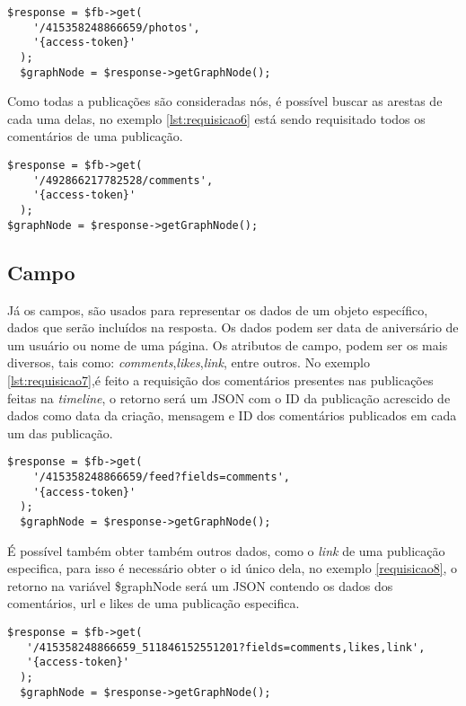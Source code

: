 \begin{lstlisting}[caption={Requisitando todas álbuns de uma página},label={lst:requisicao5}]
  $response = $fb->get( 
    '/415358248866659/photos', 
    '{access-token}'
  );
  $graphNode = $response->getGraphNode();
\end{lstlisting}

Como todas a publicações são consideradas nós, é possível buscar as arestas de cada uma delas, no exemplo \ref{lst:requisicao6} está sendo requisitado todos os comentários de uma publicação.

\begin{lstlisting}[caption={Requisitando todos os comentários de uma publicação},label={lst:requisicao6}]
  $response = $fb->get(
    '/492866217782528/comments',
    '{access-token}'
  );
$graphNode = $response->getGraphNode();
\end{lstlisting}

\subsection{Campo}
Já os campos, são usados para representar os dados de um objeto específico, dados que serão incluídos na resposta. Os dados podem ser data de aniversário de um usuário ou nome de uma página. Os atributos de campo, podem ser os mais diversos, tais como: \textit{comments},\textit{likes},\textit{link}, entre outros. No exemplo \ref{lst:requisicao7},é feito a requisição dos comentários presentes nas publicações feitas na \textit{timeline}, o retorno será um JSON com o ID da publicação acrescido de dados como data da criação, mensagem e ID dos comentários publicados em cada um das publicação.

\begin{lstlisting}[caption={Requisitar os comentários de todas as publicações da página},label={lst:requisicao7}]
  $response = $fb->get(
    '/415358248866659/feed?fields=comments',
    '{access-token}' 
  );
  $graphNode = $response->getGraphNode(); 
\end{lstlisting}

É possível também obter também outros dados, como o \textit{link} de uma publicação especifica, para isso é necessário obter o id único dela, no exemplo \ref{requisicao8}, o retorno na variável \$graphNode será um JSON contendo os dados dos comentários, url e likes de uma publicação especifica.

\begin{lstlisting}[caption={Requsição de diversos atributos},label={lst:requisicao8}]
  $response = $fb->get(
   '/415358248866659_511846152551201?fields=comments,likes,link', 
   '{access-token}'
  );
  $graphNode = $response->getGraphNode();
\end{lstlisting}

